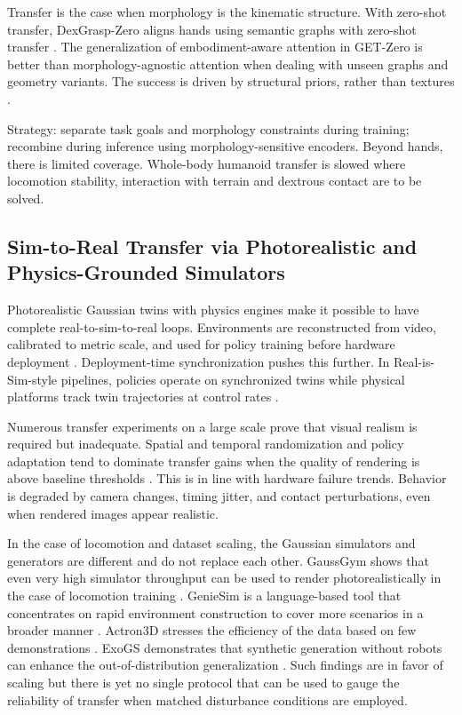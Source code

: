 \documentclass[11pt,a4paper]{article}
\begin{document}
Transfer is the case when morphology is the kinematic structure. With zero-shot transfer, DexGrasp-Zero aligns hands using semantic graphs with zero-shot transfer \cite{wu2025dexgrasp}. The generalization of embodiment-aware attention in GET-Zero is better than morphology-agnostic attention when dealing with unseen graphs and geometry variants. The success is driven by structural priors, rather than textures \cite{patel2024getzero}.

Strategy: separate task goals and morphology constraints during training; recombine during inference using morphology-sensitive encoders. Beyond hands, there is limited coverage. Whole-body humanoid transfer is slowed where locomotion stability, interaction with terrain and dextrous contact are to be solved.

\subsection{Sim-to-Real Transfer via Photorealistic and Physics-Grounded Simulators}

Photorealistic Gaussian twins with physics engines make it possible to have complete real-to-sim-to-real loops. Environments are reconstructed from video, calibrated to metric scale, and used for policy training before hardware deployment \cite{gao2024mirage2matter,jiang2025gsworld}. Deployment-time synchronization pushes this further. In Real-is-Sim-style pipelines, policies operate on synchronized twins while physical platforms track twin trajectories at control rates \cite{abou2024realissim}.

Numerous transfer experiments on a large scale prove that visual realism is required but inadequate. Spatial and temporal randomization and policy adaptation tend to dominate transfer gains when the quality of rendering is above baseline thresholds \cite{jin2026grounding}. This is in line with hardware failure trends. Behavior is degraded by camera changes, timing jitter, and contact perturbations, even when rendered images appear realistic.

In the case of locomotion and dataset scaling, the Gaussian simulators and generators are different and do not replace each other. GaussGym shows that even very high simulator throughput can be used to render photorealistically in the case of locomotion training \cite{escontrela2025gaussgym}. GenieSim is a language-based tool that concentrates on rapid environment construction to cover more scenarios in a broader manner \cite{yin2024geniesim}. Actron3D stresses the efficiency of the data based on few demonstrations \cite{zhang2025actron3d}. ExoGS demonstrates that synthetic generation without robots can enhance the out-of-distribution generalization \cite{wang2026exogs}. Such findings are in favor of scaling but there is yet no single protocol that can be used to gauge the reliability of transfer when matched disturbance conditions are employed.
\end{document}

